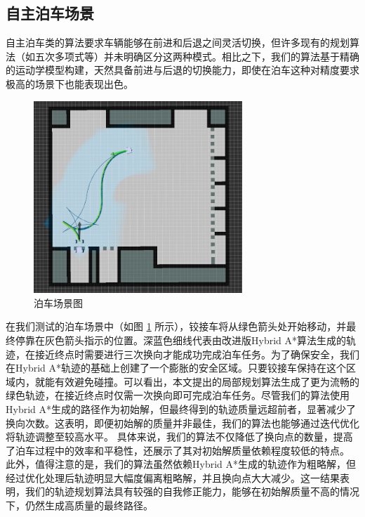 \documentclass[master,academic]{ysuthesis} %
\begin{document}
		\subsection{自主泊车场景}
		自主泊车类的算法要求车辆能够在前进和后退之间灵活切换，但许多现有的规划算法（如五次多项式等）并未明确区分这两种模式。相比之下，我们的算法基于精确的运动学模型构建，天然具备前进与后退的切换能力，即使在泊车这种对精度要求极高的场景下也能表现出色。
		\begin{figure}[!ht]
			\centering
			\includegraphics[width=0.7\textwidth]{boche.png}
			\caption{泊车场景图}
			\label{fig:boche}
		\end{figure}
		在我们测试的泊车场景中（如图 \ref{fig:boche} 所示），铰接车将从绿色箭头处开始移动，并最终停靠在灰色箭头指示的位置。深蓝色细线代表由改进版Hybrid A*算法生成的轨迹，在接近终点时需要进行三次换向才能成功完成泊车任务。为了确保安全，我们在Hybrid A*轨迹的基础上创建了一个膨胀的安全区域。只要铰接车保持在这个区域内，就能有效避免碰撞。可以看出，本文提出的局部规划算法生成了更为流畅的绿色轨迹，在接近终点时仅需一次换向即可完成泊车任务。尽管我们的算法使用Hybrid A*生成的路径作为初始解，但最终得到的轨迹质量远超前者，显著减少了换向次数。这表明，即便初始解的质量并非最佳，我们的算法也能够通过迭代优化将轨迹调整至较高水平。
		具体来说，我们的算法不仅降低了换向点的数量，提高了泊车过程中的效率和平稳性，还展示了其对初始解质量依赖程度较低的特点。
		此外，值得注意的是，我们的算法虽然依赖Hybrid A*生成的轨迹作为粗略解，但经过优化处理后轨迹明显大幅度偏离粗略解，并且换向点大大减少。这一结果表明，我们的轨迹规划算法具有较强的自我修正能力，能够在初始解质量不高的情况下，仍然生成高质量的最终路径。
\end{document}
